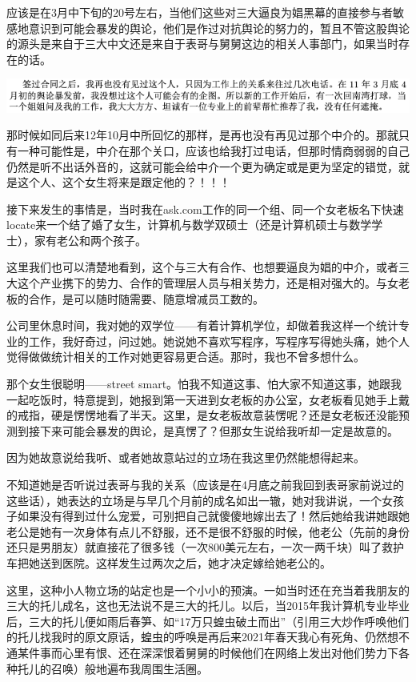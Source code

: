\documentclass[9pt, b5paper]{article}
\begin{document}
应该是在3月中下旬的20号左右，当他们这些对三大逼良为娼黑幕的直接参与者敏感地意识到可能会暴发的舆论，他们是作过对抗舆论的努力的，暂且不管这股舆论的源头是来自于三大中文还是来自于表哥与舅舅这边的相关人事部门，如果当时存在的话。

\begin{center}
\includegraphics[width=.9\linewidth]{./pic/readme_20210414_200125.png}
\end{center}

那时候如同后来12年10月中所回忆的那样，是再也没有再见过那个中介的。那就只有一种可能性是，中介在那个关口，应该也给我打过电话，但那时情商弱弱的自己仍然是听不出话外音的，这就可能会给中介一个更为确定或是更为坚定的错觉，就是这个人、这个女生将来是跟定他的？！！！

接下来发生的事情是，当时我在ask.com工作的同一个组、同一个女老板名下快速locate来一个结了婚了女生，计算机与数学双硕士（还是计算机硕士与数学学士），家有老公和两个孩子。

这里我们也可以清楚地看到，这个与三大有合作、也想要逼良为娼的中介，或者三大这个产业携下的势力、合作的管理层人员与相关势力，还是相对强大的。与女老板的合作，是可以随时随需要、随意增减员工数的。 

公司里休息时间，我对她的双学位——有着计算机学位，却做着我这样一个统计专业的工作，我好奇过，问过她。她说她不喜欢写程序，写程序写得她头痛，她个人觉得做做统计相关的工作对她更容易更合适。那时，我也不曾多想什么。 

那个女生很聪明——street smart。怕我不知道这事、怕大家不知道这事，她跟我一起吃饭时，特意提到，她报到第一天进到女老板的办公室，女老板看见她手上戴的戒指，硬是愣愣地看了半天。这里，是女老板故意装愣呢？还是女老板还没能预测到接下来可能会暴发的舆论，是真愣了？但那女生说给我听却一定是故意的。

因为她故意说给我听、或者她故意站过的立场在我这里仍然能想得起来。 

不知道她是否听说过表哥与我的关系（应该是在4月底之前我回到表哥家前说过的这些话），她表达的立场是与早几个月前的成名如出一辙，她对我讲说，一个女孩子如果没有得到过什么宠爱，可别把自己就傻傻地嫁出去了！然后她给我讲她跟她老公是她有一次身体有点儿不舒服，还不是很不舒服的时候，他老公（先前的身份还只是男朋友）就直接花了很多钱（一次800美元左右，一次一两千块）叫了救护车把她送到医院。这样发生过两次之后，她才决定嫁给她老公的。 

这里，这种小人物立场的站定也是一个小小的预演。一如当时还在充当着我朋友的三大的托儿成名，这也无法说不是三大的托儿。以后，当2015年我计算机专业毕业后，三大的托儿便如雨后春笋、如“17万只蝗虫破土而出”（引用三大炒作呼唤他们的托儿找我时的原文原话，蝗虫的呼唤是再后来2021年春天我心有死角、仍然想不通某件事而心里有恨、还在深深恨着舅舅的时候他们在网络上发出对他们势力下各种托儿的召唤）般地遍布我周围生活圈。
\end{document}
